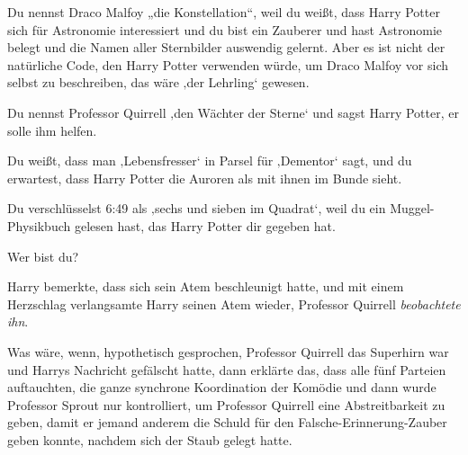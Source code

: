 Du nennst Draco Malfoy „die Konstellation“, weil du weißt, dass Harry Potter sich für Astronomie interessiert und du bist ein Zauberer und hast Astronomie belegt und die Namen aller Sternbilder auswendig gelernt. Aber es ist nicht der natürliche Code, den Harry Potter verwenden würde, um Draco Malfoy vor sich selbst zu beschreiben, das wäre ‚der Lehrling‘ gewesen.

Du nennst Professor Quirrell ‚den Wächter der Sterne‘ und sagst Harry Potter, er solle ihm helfen.

Du weißt, dass man ‚Lebensfresser‘ in Parsel für ‚Dementor‘ sagt, und du erwartest, dass Harry Potter die Auroren als mit ihnen im Bunde sieht.

Du verschlüsselst 6:49 als ‚sechs und sieben im Quadrat‘, weil du ein Muggel-Physikbuch gelesen hast, das Harry Potter dir gegeben hat.

Wer bist du?

Harry bemerkte, dass sich sein Atem beschleunigt hatte, und mit einem Herzschlag verlangsamte Harry seinen Atem wieder, Professor Quirrell \emph{beobachtete ihn}.

Was wäre, wenn, hypothetisch gesprochen, Professor Quirrell das Superhirn war und Harrys Nachricht gefälscht hatte, dann erklärte das, dass alle fünf Parteien auftauchten, die ganze synchrone Koordination der Komödie und dann wurde Professor Sprout nur kontrolliert, um Professor Quirrell eine Abstreitbarkeit zu geben, damit er jemand anderem die Schuld für den Falsche-Erinnerung-Zauber geben konnte, nachdem sich der Staub gelegt hatte.

